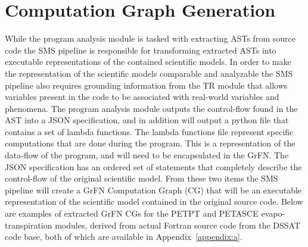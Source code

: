 \section{Computation Graph Generation\label{sec:cg_gen}}
While the program analysis module is tasked with extracting ASTs from source code the SMS pipeline is responsible for transforming extracted ASTs into executable representations of the contained scientific models.
In order to make the representation of the scientific models comparable and analyzable the SMS pipeline also requires grounding information from the TR module that allows variables present in the code to be associated with real-world variables and phenomena.
The program analysis module outputs the control-flow found in the AST into a JSON specification, and in addition will output a python file that contains a set of lambda functions.
The lambda functions file represent specific computations that are done during the program.
This is a representation of the data-flow of the program, and will need to be encapsulated in the GrFN.
The JSON specification has an ordered set of statements that completely describe the control-flow of the original scientific model.
From these two items the SMS pipeline will create a GrFN Computation Graph (CG) that will be an executable representation of the scientific model contained in the original source code.
Below are examples of extracted GrFN CGs for the PETPT and PETASCE evapo-transpiration modules, derived from actual Fortran source code from the DSSAT code base, both of which are available in Appendix~\ref{appendix:a}.

